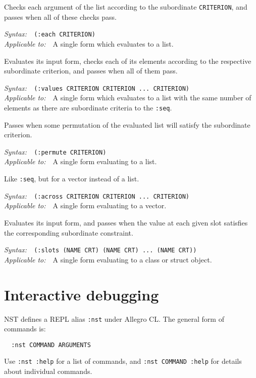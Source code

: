 \documentclass{article}
\newenvironment{criteria}%
{\begin{list}{}
    {\setlength{\labelwidth}{0pt}
     \setlength{\leftmargin}{2em}
     \setlength{\rightmargin}{1em}
     \setlength{\itemindent}{0em}}}%
  {\end{list}}
\def\criterion#1#2#3#4{\item[\bfseries #1] #4\par
  \emph{Syntax:}~~\texttt{#2}\\ \emph{Applicable to:}~~#3}
\begin{document}
\begin{criteria}
  \criterion{:each}{(:each CRITERION)}{A single form which evaluates
    to a list.}{Checks each argument of the list according to the
    subordinate \texttt{CRITERION}, and passes when all of these
    checks pass.}

  \criterion{:seq}{(:values CRITERION CRITERION ...\ CRITERION)}{A
    single form which evaluates to a list with the same number of
    elements as there are subordinate criteria to the
    \texttt{:seq}.}{Evaluates its input form, checks each of its
    elements according to the respective subordinate criterion, and
    passes when all of them pass.}

  \criterion{:permute}{(:permute CRITERION)}{A single form evaluating
    to a list.}{Passes when some permutation of the evaluated list
    will satisfy the subordinate criterion.}

  \criterion{:across}{(:across CRITERION CRITERION ...\ CRITERION)}{A
    single form evaluating to a vector.}{Like \texttt{:seq}, but for a
    vector instead of a list.}

  \criterion{:slots}{\small(:slots (NAME CRT) (NAME CRT) ...\ (NAME
    CRT))}{A single form evaluating to a class or struct
    object.}{Evaluates its input form, and passes when the value at
    each given slot satisfies the corresponding subordinate
    constraint.}
\end{criteria}

\section*{Interactive debugging}
NST defines a REPL alias \texttt{:nst} under Allegro CL.  The general
form of commands is:
\begin{verbatim}
  :nst COMMAND ARGUMENTS
\end{verbatim}
Use \mbox{\texttt{:nst :help}} for a list of commands, and
\mbox{\texttt{:nst COMMAND :help}} for details about individual
commands.
\end{document}
